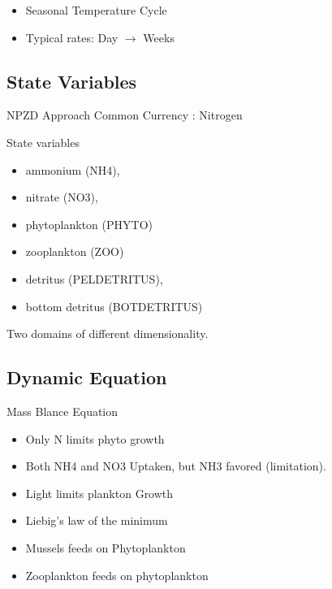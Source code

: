 \documentclass[final,xcolor=dvipsnames]{beamer}
\begin{document}
\begin{frame}
\begin{exampleblock}{}
\begin{itemize}[<+->]
    \item Seasonal Temperature Cycle
    \item Typical rates: Day $\rightarrow$ Weeks
\end{itemize}
\end{exampleblock}
\end{frame}

\subsection{State Variables}


\begin{frame}
NPZD Approach
Common Currency : Nitrogen
\begin{exampleblock}{State variables}
\begin{itemize}
    \item ammonium (NH4),
    \item nitrate (NO3),
    \item phytoplankton (PHYTO)
    \item zooplankton (ZOO)
    \item detritus (PELDETRITUS),
    \item bottom detritus (BOTDETRITUS)
\end{itemize} 
\end{exampleblock}

\begin{exampleblock}
Two domains of different dimensionality.
\end{exampleblock}
\end{frame}

\subsection{Dynamic Equation}
\begin{frame}
\begin{block}{Mass Blance Equation}
\begin{itemize}
    \item Only N limits phyto growth
    \item Both NH4 and NO3 Uptaken, but NH3 favored (limitation).
    \item Light limits plankton Growth  
    \item Liebig's law of the minimum
    \item Mussels feeds on Phytoplankton
    \item Zooplankton feeds on phytoplankton
\end{itemize} 
\end{block}
\end{frame}
\end{document}
